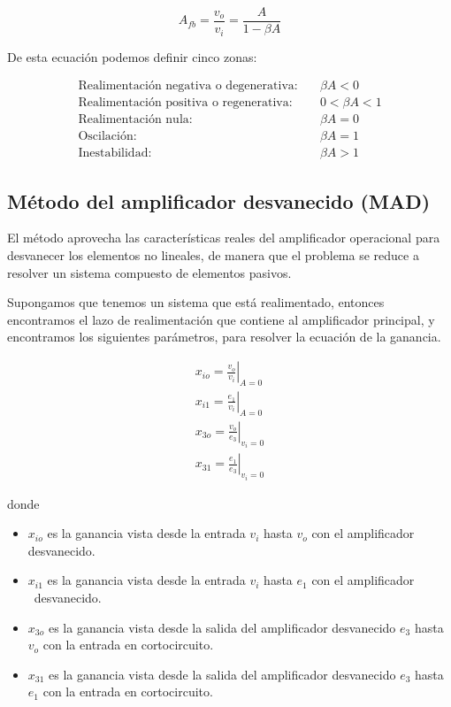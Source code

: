 \begin{equation}
    \boxed{A_{fb} = \frac{v_o}{v_i} = \frac{A}{1 - \beta A}}
    \label{eq:mt-func-transferencia-realimentacion}
\end{equation}

De esta ecuación podemos definir cinco zonas:

\begin{align*}
\text{Realimentación negativa o degenerativa:} & \quad \beta A < 0 \\
\text{Realimentación positiva o regenerativa:} & \quad 0 < \beta A < 1 \\
\text{Realimentación nula:} & \quad \beta A = 0 \\
\text{Oscilación:} & \quad \beta A = 1 \\
\text{Inestabilidad:} & \quad \beta A > 1
\end{align*}

\subsection{Método del amplificador desvanecido (MAD)}

 El método aprovecha las características reales del
amplificador operacional para desvanecer los elementos no lineales, de manera que el problema se reduce a resolver un sistema compuesto de elementos pasivos.

Supongamos que tenemos un sistema que está realimentado, entonces encontramos el lazo de realimentación que contiene al amplificador principal,
y encontramos los siguientes parámetros, para resolver la ecuación de la ganancia.


\begin{align*}
    x_{io} = \left. \frac{v_o}{v_i} \right|_{A=0} \\
    x_{i1} = \left. \frac{e_1}{v_i} \right|_{A=0} \\
    x_{3o} = \left. \frac{v_o}{e_3} \right|_{v_i=0} \\
    x_{31} = \left. \frac{e_1}{e_3} \right|_{v_i=0}
\end{align*}

donde

\begin{itemize}
    \item $x_{io}$ es la ganancia vista desde la entrada $v_i$ hasta $v_o$ con el amplificador
desvanecido.
    \item $x_{i1}$ es la ganancia vista desde la entrada $v_i$ hasta $e_1$ con el amplificador \
desvanecido.
    \item $x_{3o}$ es la ganancia vista desde la salida del amplificador desvanecido $e_3$
hasta $v_o$ con la entrada en cortocircuito.
    \item $x_{31}$ es la ganancia vista desde la salida del amplificador desvanecido $e_3$
hasta $e_1$ con la entrada en cortocircuito.
\end{itemize}

